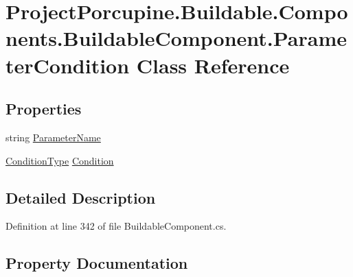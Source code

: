 \hypertarget{class_project_porcupine_1_1_buildable_1_1_components_1_1_buildable_component_1_1_parameter_condition}{}\section{Project\+Porcupine.\+Buildable.\+Components.\+Buildable\+Component.\+Parameter\+Condition Class Reference}
\label{class_project_porcupine_1_1_buildable_1_1_components_1_1_buildable_component_1_1_parameter_condition}
\subsection*{Properties}
\begin{DoxyCompactItemize}
\item 
string \hyperlink{class_project_porcupine_1_1_buildable_1_1_components_1_1_buildable_component_1_1_parameter_condition_ab86cb8f2ff5f7607dc8569b3a41d0b32}{Parameter\+Name}
\item 
\hyperlink{class_project_porcupine_1_1_buildable_1_1_components_1_1_buildable_component_a3d88a65107c808a21df55bde70954ffc}{Condition\+Type} \hyperlink{class_project_porcupine_1_1_buildable_1_1_components_1_1_buildable_component_1_1_parameter_condition_a81d56f34122b6659ce7a7a2dfe6342a8}{Condition}
\end{DoxyCompactItemize}


\subsection{Detailed Description}


Definition at line 342 of file Buildable\+Component.\+cs.



\subsection{Property Documentation}
\mbox{\label{class_project_porcupine_1_1_buildable_1_1_components_1_1_buildable_component_1_1_parameter_condition_a81d56f34122b6659ce7a7a2dfe6342a8}} 
